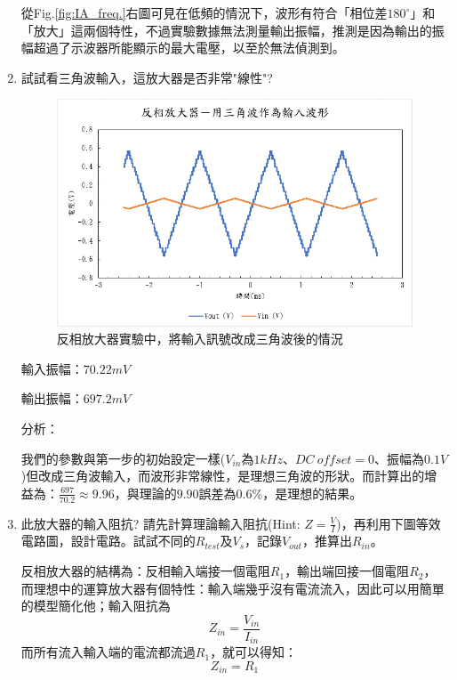 \documentclass[12pt,a4paper]{article}
\begin{document}
\begin{CJK}{UTF8}{bkai}
\begin{enumerate}
從Fig.\ref{fig:IA_freq.}右圖可見在低頻的情況下，波形有符合「相位差$180^\circ$」和「放大」這兩個特性，不過實驗數據無法測量輸出振幅，推測是因為輸出的振幅超過了示波器所能顯示的最大電壓，以至於無法偵測到。
    
    \item 試試看三角波輸入，這放大器是否非常"線性"?

\begin{figure}[h]
    \centering
    \includegraphics[width=0.7\linewidth]{figures/ia/Inverting amplifier with triangle wave input.png}
    \caption{反相放大器實驗中，將輸入訊號改成三角波後的情況}
    \label{fig:IA_tri}
\end{figure}

輸入振幅：$70.22mV$

輸出振幅：$697.2mV$

\noindent 分析：

我們的參數與第一步的初始設定一樣($V_{in}$為$1kHz$、$DC\ offset=0$、振幅為$0.1V$)但改成三角波輸入，而波形非常線性，是理想三角波的形狀。而計算出的增益為：$\frac{697}{70.2}\approx9.96$，與理論的$9.90$誤差為$0.6\%$，是理想的結果。
    
    \item 此放大器的輸入阻抗? 請先計算理論輸入阻抗(Hint: $Z=\frac{V}{I}$)，再利用下圖等效電路圖，設計電路。試試不同的$ R_{test} $及$ V_s$，記錄$V_{out}$，推算出$R_{in}$。

    反相放大器的結構為：反相輸入端接一個電阻$R_1$，輸出端回接一個電阻$R_2$，而理想中的運算放大器有個特性：輸入端幾乎沒有電流流入，因此可以用簡單的模型簡化他；輸入阻抗為
    \begin{equation}
        Z_{in}=\frac{V_{in}}{I_{in}}
        \nonumber
    \end{equation}
而所有流入輸入端的電流都流過$R_1$，就可以得知：
\begin{equation}
    Z_{in}=R_1
    \nonumber
\end{equation}


\end{enumerate}
\end{CJK}
\end{document}
